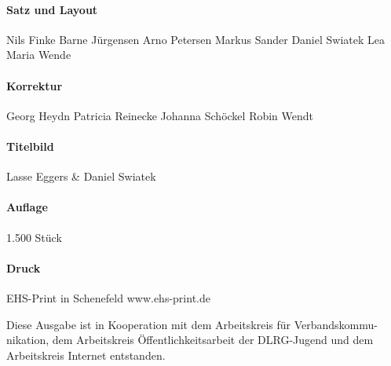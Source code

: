\paragraph{Satz und Layout}
Nils Finke\newline
Barne Jürgensen\newline
Arno Petersen\newline
Markus Sander\newline
Daniel Swiatek\newline
Lea Maria Wende
\paragraph{Korrektur}
Georg Heydn\newline
Patricia Reinecke\newline
Johanna Schöckel\newline
Robin Wendt
\paragraph{Titelbild}
Lasse Eggers & Daniel Swiatek\newline
\paragraph{Auflage}
1.500 Stück
\paragraph{Druck}
EHS-Print in Schenefeld\newline
www.ehs-print.de\newline

Diese Ausgabe ist in Kooperation mit dem Arbeitskreis für Verbandskommu-
nikation, dem Arbeitskreis Öffentlichkeitsarbeit der DLRG-Jugend und dem
Arbeitskreis Internet entstanden.


\newpage